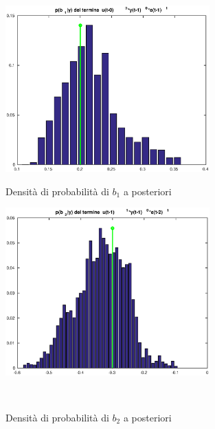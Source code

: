 \documentclass[10pt,a4paper,oneside,openany,noindent]{report}
\begin{document}
\begin{figure}[ht]
\begin{minipage}[b]{0.45\linewidth}
\centering
\includegraphics[width=0.7\textwidth]{bq_1.eps}
\caption{Densità di probabilità di $b_1$ a posteriori}
\label{fig:minipage1}
\end{minipage}
\quad
\begin{minipage}[b]{0.45\linewidth}
\centering
\includegraphics[width=0.7\textwidth]{bq_2.eps}
\caption{Densità di probabilità di $b_2$ a posteriori}
\label{fig:minipage2}
\end{minipage}\\
\end{figure}
\end{document}
